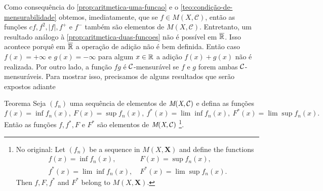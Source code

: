 Como consequência do \ref{prop:aritmetica-uma-funcao} e o \ref{teo:condição-de-mensurabilidade} obtemos, imediatamente, que se $ f \in M(X,\mathcal{C})$, então as funções $cf, f^2, |f|, f^+$ e $f^-$ também são elementos de $M(X, \mathcal{C})$.
Entretanto, um resultado análogo à \ref{prop:aritmetica-duas-funcoes} não é possível em $\operatorname{\overline{\mathbb{R}}}$.
Isso acontece porquê em $\operatorname{\overline{\mathbb{R}}}$ a operação de adição não é bem definida.
Então caso $f(x) = +\infty$ e $g(x) = -\infty$ para algum $x \in \mathbb{R}$ a adição
$f(x) + g(x)$ não é realizada.
Por outro lado, a função $fg$ é $\operatorname{\mathcal{C}}$-mensurável se $f$ e $g$ forem ambas $\operatorname{\mathcal{C}}$-mensuráveis.
Para mostrar isso, precisamos de alguns resultados que serão expostos adiante

\begin{env}{Teorema}
\label{teo:mensurabilidade-sequencia-funcoes-mensuraveis}
	Seja $(f_n)$ uma sequência de elementos de $\operatorname{\textit{M}(\textit{X}, \mathcal{C} )}$ e defina as funções
	$$f(x) = \inf f_n(x),\  
	F(x) = \sup f_n(x),\  
	f^*(x) = \lim\inf f_n(x),\   
	F^*(x) = \lim\sup f_n(x).$$
	Então as funções $f, f^*, F$ e $F^*$ são elementos de $\operatorname{\textit{M}(\textit{X}, \mathcal{C} )}$
	\cite[p. 12, tradução nossa, adaptação nossa]{bartle}
	\footnote{No original: 
		Let $(f_n)$ be a sequence in $M(X, \textbf{X})$ and define the functions
		\begin{align*}
			f(x) = \inf f_n(x),\ & 
			F(x) = \sup f_n(x),\\
			f^*(x) = \lim \inf f_n(x),\ & 
			F^*(x) = \lim \sup f_n(x).
		\end{align*}
		Then $f, F, f^*$ and $F^*$ belong to $M(X, \textbf{X})$.}.
\end{env}
